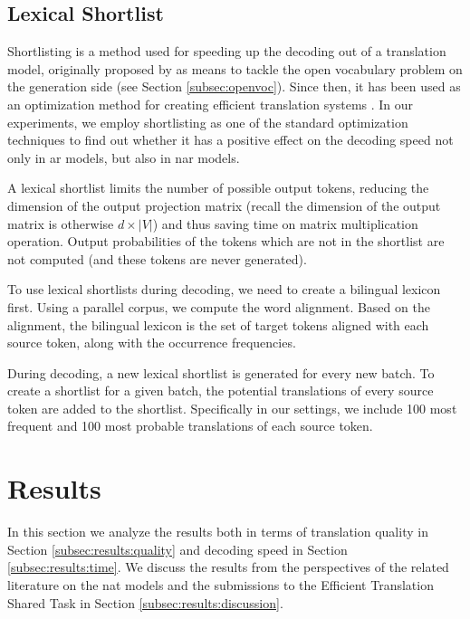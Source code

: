 \subsection{Lexical Shortlist}
\label{subsec:exp:shortlist}

Shortlisting is a method used for speeding up the decoding out of a translation
model, originally proposed by \citet{jean-etal-2015-using} as means to tackle
the open vocabulary problem on the generation side (see Section
\ref{subsec:openvoc}). Since then, it has been used as an optimization method
for creating efficient translation systems \citep{kim-etal-2019-research,
  bogoychev-etal-2020-edinburghs}.  In our experiments, we employ shortlisting
as one of the standard optimization techniques to find out whether it has a
positive effect on the decoding speed not only in \ac{ar} models, but also in
\ac{nar} models.

A lexical shortlist limits the number of possible output tokens, reducing the
dimension of the output projection matrix (recall the dimension of the output
matrix is otherwise $d \times |V|$) and thus saving time on matrix
multiplication operation. Output probabilities of the tokens which are not in
the shortlist are not computed (and these tokens are never generated).

To use lexical shortlists during decoding, we need to create a bilingual
lexicon first. Using a parallel corpus, we compute the word alignment. Based on
the alignment, the bilingual lexicon is the set of target tokens aligned with
each source token, along with the occurrence frequencies.

During decoding, a new lexical shortlist is generated for every new batch. To
create a shortlist for a given batch, the potential translations of every
source token are added to the shortlist. Specifically in our settings, we
include 100 most frequent and 100 most probable translations of each source
token.

\section{Results}%
\label{sec:exp:results}

In this section we analyze the results both in terms of translation quality in
Section \ref{subsec:results:quality} and decoding speed in Section
\ref{subsec:results:time}. We discuss the results from the perspectives of the
related literature on the \ac{nat} models and the submissions to the Efficient
Translation Shared Task in Section \ref{subsec:results:discussion}.


